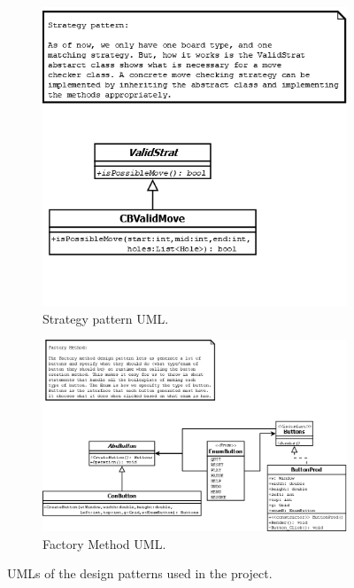 \documentclass[10pt,conference,onecolumn,compsoc]{IEEEtran}
\begin{document}
\begin{figure}[H]
\centering
\begin{subfigure}{.4\textwidth}
  \centering
  \includegraphics[width=.85\linewidth]{strategy.png}
  \caption{Strategy pattern UML.}
  \label{fig:strategy}
\end{subfigure}%
\begin{subfigure}{.6\textwidth}
  \centering
  \includegraphics[width=.9\linewidth]{factorymethod.png}
  \caption{Factory Method UML.}
  \label{fig:factory}
\end{subfigure}
\caption{UMLs of the design patterns used in the project.}
\label{fig:patterns}
\end{figure}
\end{document}
